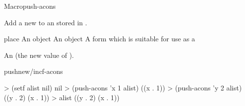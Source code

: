 \documentclass[10pt,twoside,english,pdftex]{article}
\begin{document}
\begin{functiondoc}{Macro}{push-acons}{ \returns{}
    } 
%
%
  
\fnsyntax

\fnpurpose Add a new   to an
 stored in .

\fnpackage {}

\fnmodule {}

\fnargs
\begin{args}{place}
\arg[item] An object
\arg[value] An object
\arg[place] A form which is suitable for use as a
\end{args}

\fnreturns An  (the new value of
). 

\begin{alsos}{pushnew/incf-acons}
\end{alsos}

\fnexamples
\begin{example}
> (setf alist nil)
nil
> (push-acons 'x 1 alist)
((x . 1))
> (push-acons 'y 2 alist)
((y . 2) (x . 1))
> alist
((y . 2) (x . 1))
\end{example}

\end{functiondoc}

\end{document}
